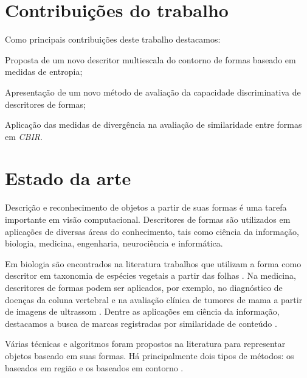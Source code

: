 \section*{Contribuições do trabalho}

Como principais contribuições deste trabalho destacamos:

\begin{alineas}
\item Proposta de um novo descritor multiescala do contorno de formas baseado em medidas de entropia;
\item Apresentação de um novo método de avaliação da capacidade discriminativa de descritores de formas;
\item Aplicação das medidas de divergência na avaliação de similaridade entre formas em \emph{CBIR}.
\end{alineas}




\section*{Estado da arte}

Descrição e reconhecimento de objetos a partir de suas formas é uma tarefa importante em visão computacional. Descritores de formas são utilizados em aplicações de diversas áreas do conhecimento, tais como ciência da informação, biologia, medicina, engenharia, neurociência e informática. 

Em biologia são encontrados na literatura trabalhos que utilizam a forma como descritor em taxonomia de espécies vegetais a partir das folhas \cite{Fotopoulou:2013, Nam2008245, Wang:2000}. Na medicina, descritores de formas podem ser aplicados, por exemplo, no diagnóstico de doenças da coluna vertebral \cite{Lee:2009} e na avaliação clínica de tumores de mama a partir de imagens de ultrassom \cite{Yang:2009}. Dentre as aplicações em ciência da informação, destacamos a busca de marcas registradas por similaridade de conteúdo \cite{MohdAnuar2013105,Qi20102017}.

Várias técnicas e algoritmos foram propostos na literatura para representar objetos baseado em suas formas. Há principalmente dois tipos de métodos: os baseados em região e os baseados em contorno \cite{Zhang:2004}. 

